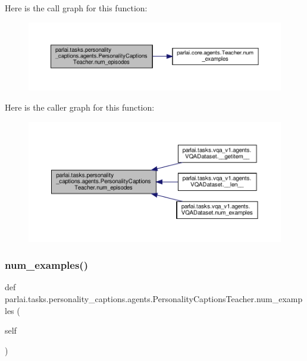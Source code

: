 Here is the call graph for this function\+:
\nopagebreak
\begin{figure}[H]
\begin{center}
\leavevmode
\includegraphics[width=350pt]{classparlai_1_1tasks_1_1personality__captions_1_1agents_1_1PersonalityCaptionsTeacher_a4d6d5ae65fc9d19ad7d847dbfd106427_cgraph}
\end{center}
\end{figure}
Here is the caller graph for this function\+:
\nopagebreak
\begin{figure}[H]
\begin{center}
\leavevmode
\includegraphics[width=350pt]{classparlai_1_1tasks_1_1personality__captions_1_1agents_1_1PersonalityCaptionsTeacher_a4d6d5ae65fc9d19ad7d847dbfd106427_icgraph}
\end{center}
\end{figure}
\mbox{\label{classparlai_1_1tasks_1_1personality__captions_1_1agents_1_1PersonalityCaptionsTeacher_aa19ecea79bceee398eafd3a903e67349}} 
\subsubsection{\texorpdfstring{num\+\_\+examples()}{num\_examples()}}
{\footnotesize\ttfamily def parlai.\+tasks.\+personality\+\_\+captions.\+agents.\+Personality\+Captions\+Teacher.\+num\+\_\+examples (\begin{DoxyParamCaption}\item[{}]{self }\end{DoxyParamCaption})}

